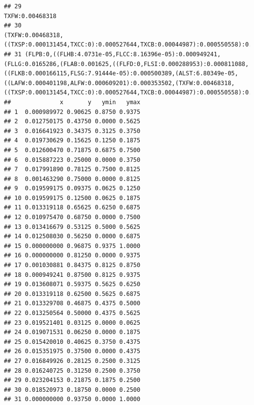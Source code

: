 \documentclass[]{article}
\begin{document}
\begin{verbatim}
## 29                                                                                                                                                                                                                                                                                                                                                                                                                  TXFW:0.00468318
## 30                                                                                                                                                                                                                                                                                                                                 (TXFW:0.00468318,((TXSP:0.000131454,TXCC:0):0.000527644,TXCB:0.00044987):0.000550558):0.00263375
## 31 (FLPB:0,((FLHB:4.0731e-05,FLCC:8.16396e-05):0.000949241,(FLLG:0.0165286,(FLAB:0.001625,((FLFD:0,FLSI:0.000288953):0.000811088,((FLKB:0.000166115,FLSG:7.91444e-05):0.000500389,(ALST:6.80349e-05,((LAFW:0.000401198,ALFW:0.000609201):0.000353502,(TXFW:0.00468318,((TXSP:0.000131454,TXCC:0):0.000527644,TXCB:0.00044987):0.000550558):0.00263375):0.000535248):0.0026018):0.000242145):0.00153256):0.00951218):0.00146329):0);
##              x       y   ymin   ymax
## 1  0.000989972 0.90625 0.8750 0.9375
## 2  0.012750175 0.43750 0.0000 0.5625
## 3  0.016641923 0.34375 0.3125 0.3750
## 4  0.019730629 0.15625 0.1250 0.1875
## 5  0.012600470 0.71875 0.6875 0.7500
## 6  0.015887223 0.25000 0.0000 0.3750
## 7  0.017991890 0.78125 0.7500 0.8125
## 8  0.001463290 0.75000 0.0000 0.8125
## 9  0.019599175 0.09375 0.0625 0.1250
## 10 0.019599175 0.12500 0.0625 0.1875
## 11 0.013319118 0.65625 0.6250 0.6875
## 12 0.010975470 0.68750 0.0000 0.7500
## 13 0.013416679 0.53125 0.5000 0.5625
## 14 0.012508030 0.56250 0.0000 0.6875
## 15 0.000000000 0.96875 0.9375 1.0000
## 16 0.000000000 0.81250 0.0000 0.9375
## 17 0.001030881 0.84375 0.8125 0.8750
## 18 0.000949241 0.87500 0.8125 0.9375
## 19 0.013608071 0.59375 0.5625 0.6250
## 20 0.013319118 0.62500 0.5625 0.6875
## 21 0.013329708 0.46875 0.4375 0.5000
## 22 0.013250564 0.50000 0.4375 0.5625
## 23 0.019521401 0.03125 0.0000 0.0625
## 24 0.019071531 0.06250 0.0000 0.1875
## 25 0.015420010 0.40625 0.3750 0.4375
## 26 0.015351975 0.37500 0.0000 0.4375
## 27 0.016849926 0.28125 0.2500 0.3125
## 28 0.016240725 0.31250 0.2500 0.3750
## 29 0.023204153 0.21875 0.1875 0.2500
## 30 0.018520973 0.18750 0.0000 0.2500
## 31 0.000000000 0.93750 0.0000 1.0000
\end{verbatim}
\end{document}
